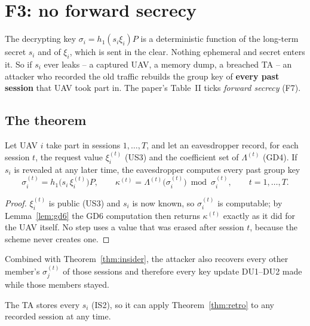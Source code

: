 \chapter{F3: no forward secrecy}\label{ch:f3}
\begin{flawbox}[title={Flaw F3 -- one leaked long-term secret opens the past}]
The decrypting key $\sigma_i=h_1(s_i\xi_i)P$ is a deterministic function of the long-term secret $s_i$ and of $\xi_i$, which is sent in the clear.
Nothing ephemeral and secret enters it. So if $s_i$ ever leaks -- a captured UAV, a memory dump, a breached TA -- an attacker who recorded the old traffic
rebuilds the group key of \textbf{every past session} that UAV took part in. The paper's Table~II ticks \emph{forward secrecy} (F7).
\end{flawbox}

\section{The theorem}
\begin{theorem}\label{thm:retro}
Let UAV $i$ take part in sessions $1,\dots,T$, and let an eavesdropper record, for each session $t$, the request value $\xi_i^{(t)}$ (US3) and the coefficient
set of $\Lambda^{(t)}$ (GD4). If $s_i$ is revealed at any later time, the eavesdropper computes every past group key
\[
\sigma_i^{(t)}=h_1\big(s_i\,\xi_i^{(t)}\big)P,\qquad \kappa^{(t)}=\Lambda^{(t)}\big(\sigma_i^{(t)}\big)\bmod\sigma_i^{(t)},\qquad t=1,\dots,T .
\]
\end{theorem}
\begin{proof}
$\xi_i^{(t)}$ is public (US3) and $s_i$ is now known, so $\sigma_i^{(t)}$ is computable; by Lemma~\ref{lem:gd6} the GD6 computation then returns
$\kappa^{(t)}$ exactly as it did for the UAV itself. No step uses a value that was erased after session $t$, because the scheme never creates one.
\end{proof}

\begin{corollary}
Combined with Theorem~\ref{thm:insider}, the attacker also recovers every other member's $\sigma_j^{(t)}$ of those sessions and therefore every key
update DU1--DU2 made while those members stayed.
\end{corollary}

\begin{corollary}
The TA stores every $s_i$ (IS2), so it can apply Theorem~\ref{thm:retro} to any recorded session at any time.
\end{corollary}

